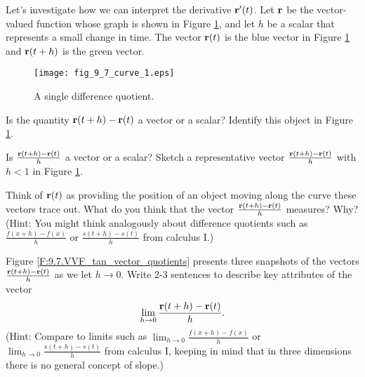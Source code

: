 \begin{activity} \label{A:9.7.1} Let's investigate how we can interpret the derivative $\mathbf{r}'(t)$. Let $\mathbf{r}$ be the vector-valued function whose graph is shown in Figure \ref{F:9.7.VVF_tan_vector}, and let $h$ be a scalar that represents a small change in time. The vector $\mathbf{r}(t)$ is the blue vector in Figure \ref{F:9.7.VVF_tan_vector} and $\mathbf{r}(t+h)$ is the green vector.
\begin{figure}[ht]
\begin{center}
\texttt{[image: fig\_9\_7\_curve\_1.eps]}
\end{center}
\caption{A single difference quotient.}
\label{F:9.7.VVF_tan_vector}
\end{figure}
    \ba
    \item Is the quantity $\mathbf{r}(t+h)-\mathbf{r}(t)$ a vector or a scalar? Identify this object in Figure \ref{F:9.7.VVF_tan_vector}.

    \item Is $\frac{\mathbf{r}(t+h)-\mathbf{r}(t)}{h}$ a vector or a scalar? Sketch a representative vector $\frac{\mathbf{r}(t+h)-\mathbf{r}(t)}{h}$ with $h < 1$ in Figure \ref{F:9.7.VVF_tan_vector}.

    \item Think of $\mathbf{r}(t)$ as providing the position of an object moving along the curve these vectors trace out.  What do you think that the vector $\frac{\mathbf{r}(t+h)-\mathbf{r}(t)}{h}$ measures? Why?  (Hint: You might think analogously about difference quotients such as $\frac{f(x+h) - f(x)}{h}$ or $\frac{s(t+h) - s(t)}{h}$ from calculus I.)

    \item Figure \ref{F:9.7.VVF_tan_vector_quotients} presents three snapshots of the vectors $\frac{\mathbf{r}(t+h)-\mathbf{r}(t)}{h}$ as we let $h \to 0$. Write 2-3 sentences to describe key attributes of the vector
        \[\displaystyle \lim_{h \to 0} \frac{\mathbf{r}(t+h)-\mathbf{r}(t)}{h}.\]
         (Hint: Compare to limits such as $\lim_{h \to 0} \frac{f(x+h) - f(x)}{h}$ or $\lim_{h \to 0} \frac{s(t+h) - s(t)}{h}$ from calculus I, keeping in mind that in three dimensions there is no general concept of slope.)




\end{activity}
